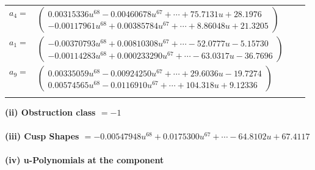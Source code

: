 \documentclass[1p]{elsarticle_modified}
\theoremstyle{definition}
\begin{document}
\begin{tabular}{m{7pt} m{180pt} m{7pt} m{180pt} }
\flushright $a_{4}=$&$\begin{pmatrix}0.00315336 u^{68}-0.00460678 u^{67}+\cdots+75.7131 u+28.1976\\-0.00117961 u^{68}+0.00385784 u^{67}+\cdots+8.86048 u+21.3205\end{pmatrix}$ \\
\flushright $a_{1}=$&$\begin{pmatrix}-0.00370793 u^{68}+0.00810308 u^{67}+\cdots-52.0777 u-5.15730\\-0.00114283 u^{68}+0.000233290 u^{67}+\cdots-63.0317 u-36.7696\end{pmatrix}$ \\
\flushright $a_{9}=$&$\begin{pmatrix}0.00335059 u^{68}-0.00924250 u^{67}+\cdots+29.6036 u-19.7274\\0.00574565 u^{68}-0.0116910 u^{67}+\cdots+104.318 u+9.12336\end{pmatrix}$\\&\end{tabular}
\flushleft \textbf{(ii) Obstruction class $= -1$}\\~\\
\flushleft \textbf{(iii) Cusp Shapes $= -0.00547948 u^{68}+0.0175300 u^{67}+\cdots-64.8102 u+67.4117$}\\~\\
\newpage\renewcommand{\arraystretch}{1}
\flushleft \textbf{(iv) u-Polynomials at the component}\newline \\
\end{document}
